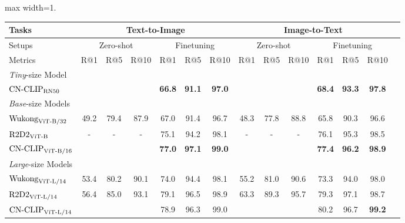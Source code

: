\begin{table}[t]
\center
\small
\vskip 0.15in
\begin{adjustbox}{max width=1.\textwidth}
\begin{tabular}{@{\extracolsep{\fill}}lccccccccccccc}
\toprule
  Tasks
  &\multicolumn{6}{c}{Text-to-Image}
  &\multicolumn{6}{c}{Image-to-Text}
  \\
\midrule
  Setups
  &\multicolumn{3}{c}{Zero-shot}
  &\multicolumn{3}{c}{Finetuning}
  &\multicolumn{3}{c}{Zero-shot}
  &\multicolumn{3}{c}{Finetuning}
  \\
\midrule
  Metrics & R@1 & R@5 & R@10 & R@1 & R@5 & R@10 & R@1 & R@5 & R@10 & R@1 & R@5 & R@10 
  \\
\midrule
    \multicolumn{13}{l}{\textit{Tiny}-size Model} \\
    $\text{CN-CLIP}\rm_{RN50}$
    & \color{gray}{48.1}	& \color{gray}{81.3}	& \color{gray}{90.5}	& \textbf{66.8}	& \textbf{91.1}	& \textbf{97.0}	& \color{gray}{51.6}	& \color{gray}{81.2}	& \color{gray}{90.5}	& \textbf{68.4}	& \textbf{93.3}	& \textbf{97.8}
    \\
\midrule
    \multicolumn{13}{l}{\textit{Base}-size Models} \\
    $\text{Wukong}\rm_{ViT\text{-}B/32}$
    & 49.2	& 79.4	& 87.9	& 67.0	& 91.4	& 96.7	& 48.3	& 77.8	& 88.8	& 65.8	& 90.3	& 96.6
    \\
    $\text{R2D2}\rm_{ViT\text{-}B}$
    & -	& -	& -	& 75.1	& 94.2	& 98.1	& -	& -	& -	& 76.1	& 95.3	& 98.5
    \\
    $\text{CN-CLIP}\rm_{ViT\text{-}B/16}$
    & \color{gray}{62.2}	& \color{gray}{86.6}	& \color{gray}{94.9}	& \textbf{77.0}	& \textbf{97.1}	& \textbf{99.0}	& \color{gray}{57.0}	& \color{gray}{84.1}	& \color{gray}{93.6}	& \textbf{77.4}	& \textbf{96.2}	& \textbf{98.9}
    \\
\midrule
    \multicolumn{9}{l}{\textit{Large}-size Models} \\
    $\text{Wukong}\rm_{ViT\text{-}L/14}$
    & 53.4	& 80.2	& 90.1	& 74.0	& 94.4	& 98.1	& 55.2	& 81.0	& 90.6	& 73.3	& 94.0	& 98.0
    \\
    $\text{R2D2}\rm_{ViT\text{-}L/14}$
    & 56.4	& 85.0	& 93.1	& 79.1	& 96.5	& 98.9	& 63.3	& 89.3	& 95.7	& 79.3	& 97.1	& 98.7
    \\
    $\text{CN-CLIP}\rm_{ViT\text{-}L/14}$
     & \color{gray}{64.0}	  & \color{gray}{89.2}	 & \color{gray}{94.4}	 & 78.9	 & 96.3	 & 99.0	 & \color{gray}{60.4}	 & \color{gray}{84.2}	 & \color{gray}{92.9}	 & 80.2	 & 96.7	 & \textbf{99.2}
    \\

\end{tabular}
\end{adjustbox}
\end{table}
